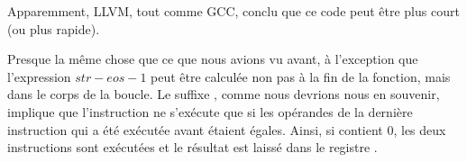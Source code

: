 Apparemment, LLVM, tout comme GCC, conclu que ce code peut être plus court (ou plus
rapide).

\mysubparagraph{\OptimizingKeilVI (\ARMMode)}




Presque la même chose que ce que nous avions vu avant, à l'exception que l'expression
$str - eos - 1$ peut être calculée non pas à la fin de la fonction, mais dans le
corps de la boucle.
Le suffixe , comme nous devrions nous en souvenir, implique que l'instruction
ne s'exécute que si les opérandes de la dernière instruction \CMP qui a été exécutée
avant étaient égales.
Ainsi, si  contient 0, les deux instructions  sont exécutées et
le résultat est laissé dans le registre .
